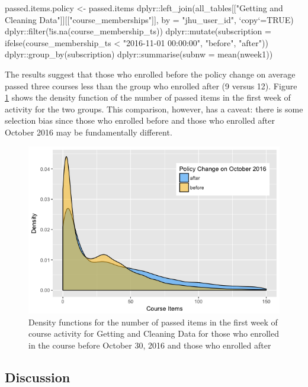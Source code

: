 \begin{Schunk}
\begin{Sinput}
passed.items.policy <- passed.items %
    dplyr::left_join(all_tables[["Getting and Cleaning Data"]][["course_memberships"]], 
                     by = "jhu_user_id", `copy`=TRUE) %
    dplyr::filter(!is.na(course_membership_ts)) %
    dplyr::mutate(subscription = ifelse(course_membership_ts < "2016-11-01 00:00:00", 
                                        "before", "after")) %
    dplyr::group_by(subscription) %
    dplyr::summarise(subnw = mean(nweek1))
\end{Sinput}
\end{Schunk}

The results suggest that those who enrolled before the policy change on
average passed three courses less than the group who enrolled after (9
versus 12). Figure \ref{figure:policy} shows the density function of the
number of passed items in the first week of activity for the two groups.
This comparison, however, has a caveat: there is some selection bias
since those who enrolled before and those who enrolled after October
2016 may be fundamentally different.

\begin{figure}[htbp]
    \centering
    \includegraphics[scale=0.5]{policy}
    \caption{Density functions for the number of passed items in the first week of course activity for Getting and Cleaning Data for those who enrolled in the course before October 30, 2016 and those who enrolled after}
    \label{figure:policy}
\end{figure}

\subsection{Discussion}\label{discussion}

